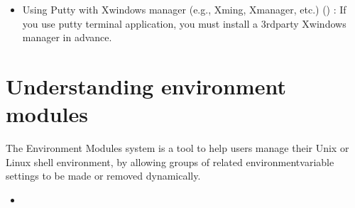 \documentclass[a4paper,11pt,english]{sphinxmanual}
\begin{document}
\begin{itemize}
\item {} 
\sphinxAtStartPar
Using Putty with Xwindows manager (e.g., Xming, Xmanager, etc.) () :
If you use putty terminal application, you must install a 3rd\sphinxhyphen{}party Xwindows manager in advance.

\end{itemize}




\section{Understanding environment modules}
\label{\detokenize{guide:understanding-environment-modules}}\label{\detokenize{guide:module-details}}
\sphinxAtStartPar
The Environment Modules system is a tool to help users manage their Unix or Linux shell environment, by allowing groups of related environment\sphinxhyphen{}variable settings to be made or removed dynamically.
\begin{itemize}
\item {} 
\sphinxAtStartPar
{}

\end{itemize}
\end{document}
